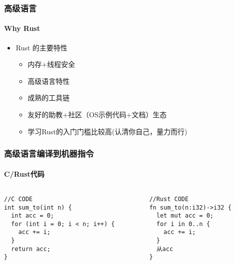 \begin{frame}
	\frametitle{高级语言}
	\framesubtitle{Why Rust}
	
	\begin{itemize}
		
		\item Rust 的主要特性
		\begin{itemize}
			\item 内存+线程安全
			\item 高级语言特性
			\item 成熟的工具链
			\item 友好的助教+社区（OS示例代码+文档）生态
			\item 学习Rust的入门门槛比较高(认清你自己，量力而行)
		\end{itemize}
		
	\end{itemize}	
	
\end{frame}





\begin{frame}[fragile]
	\frametitle{高级语言编译到机器指令}
	\framesubtitle{C/Rust代码}

	\begin{columns}[t]
	\begin{column}{.45\linewidth}
		
\begin{block}{}
\begin{verbatim}
//C CODE
int sum_to(int n) {
  int acc = 0;
  for (int i = 0; i < n; i++) {
    acc += i;
  }
  return acc;
}
\end{verbatim}
\end{block}
\end{column}

\begin{column}{.45\linewidth}
\begin{block}{}
\begin{verbatim}
//Rust CODE
fn sum_to(n:i32)->i32 {
  let mut acc = 0;
  for i in 0..n {
    acc += i;
  }
  从acc
}
\end{verbatim}
\end{block}
\end{column}
\end{columns}
	
\end{frame}





